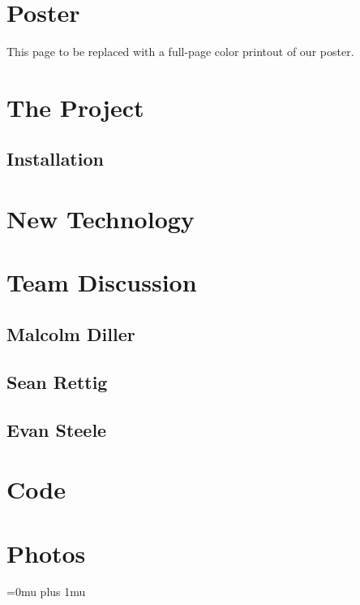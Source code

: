\documentclass[10pt,draftclsnofoot,onecolumn]{IEEEtran}
\begin{document}
\section{Poster}
\newpage
This page to be replaced with a full-page color printout of our poster.
\newpage
\section{The Project}

\subsection{Installation}

\section{New Technology}

\section{Team Discussion}
\subsection{Malcolm Diller}

\subsection{Sean Rettig}

\subsection{Evan Steele}

\section{Code}
\section{Photos}
\Urlmuskip=0mu plus 1mu\relax


\end{document}
